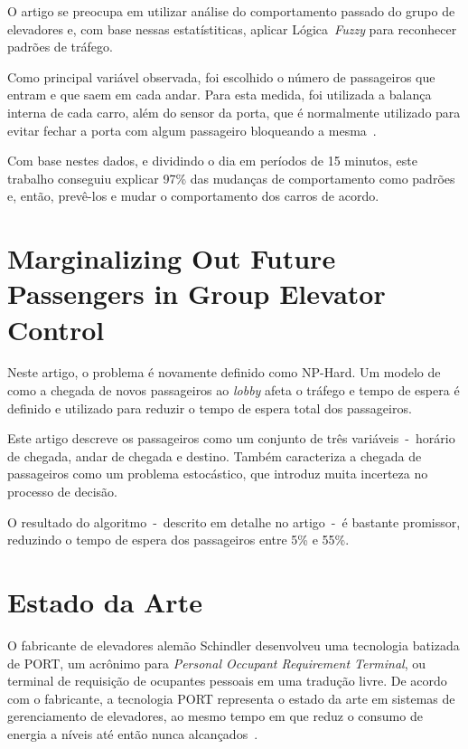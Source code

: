 O artigo  se preocupa em utilizar análise do comportamento passado do grupo de
elevadores e, com base nessas estatístiticas, aplicar Lógica~\textit{Fuzzy} para
reconhecer padrões de tráfego.

Como principal variável observada, foi escolhido o número de passageiros que
entram e que saem em cada andar. Para esta medida, foi utilizada a balança
interna de cada carro, além do sensor da porta, que é normalmente utilizado para
evitar fechar a porta com algum passageiro bloqueando a mesma~\cite{marja97}.

Com base nestes dados, e dividindo o dia em períodos de 15 minutos, este
trabalho conseguiu explicar 97\% das mudanças de comportamento como padrões e,
então, prevê-los e mudar o comportamento dos carros de acordo.

\section{\label{section:dblp}Marginalizing Out Future Passengers in Group Elevator
Control~\cite{DBLP:journals/corr/abs-1212-2499}}

Neste artigo, o problema é novamente definido como NP-Hard. Um modelo de como a
chegada de novos passageiros ao \textit{lobby} afeta o tráfego e tempo de espera
é definido e utilizado para reduzir o tempo de espera total dos passageiros.

Este artigo descreve os passageiros como um conjunto de três variáveis~-~horário
de chegada, andar de chegada e destino. Também caracteriza a chegada de
passageiros como um problema estocástico, que introduz muita incerteza no
processo de decisão.

O resultado do algoritmo~-~descrito em detalhe no artigo~-~é bastante
promissor, reduzindo o tempo de espera dos passageiros entre 5\% e 55\%.

\section{\label{section:art}Estado da Arte}

O fabricante de elevadores alemão Schindler desenvolveu uma tecnologia batizada
de PORT, um acrônimo para \textit{Personal Occupant Requirement Terminal}, ou
terminal de requisição de ocupantes pessoais em uma tradução livre. De acordo
com o fabricante, a tecnologia PORT representa o estado da arte em sistemas de
gerenciamento de elevadores, ao mesmo tempo em que reduz o consumo de energia a
níveis até então nunca alcançados~\cite{Schindler14}.

